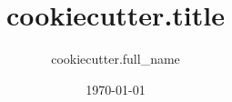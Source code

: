 \documentclass{beamer}
\title{ {{cookiecutter.title}} }
\author{ {{cookiecutter.full_name}} }
\date{\today}
\begin{document}
\frame{
  \titlepage{}
}

\frame{
}

\frame{
}
\end{document}
